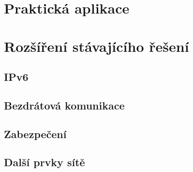 \chapter{Praktická aplikace}

\chapter{Rozšíření stávajícího řešení}
\section{IPv6}
\section{Bezdrátová komunikace}
\section{Zabezpečení}
\section{Další prvky sítě}